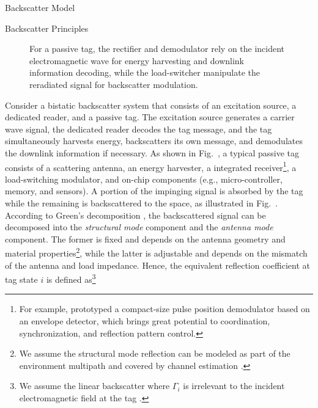 \documentclass[journal]{IEEEtran}
\begin{document}
\begin{section}{Backscatter Model}
\begin{subsection}{Backscatter Principles}
\begin{figure}[!t]
{					\label{fi:block_diagram}
				}
				\caption{For a passive tag, the rectifier and demodulator rely on the incident electromagnetic wave for energy harvesting and downlink information decoding, while the load-switcher manipulate the reradiated signal for backscatter modulation.}
				\label{fi:tag}
			\end{figure}
			Consider a bistatic backscatter system that consists of an excitation source, a dedicated reader, and a passive tag. The excitation source generates a carrier wave signal, the dedicated reader decodes the tag message, and the tag simultaneously harvests energy, backscatters its own message, and demodulates the downlink information if necessary. As shown in Fig.~, a typical passive tag consists of a scattering antenna, an energy harvester, a integrated receiver\footnote{For example, \cite{Kim2021a} prototyped a compact-size pulse position demodulator based on an envelope detector, which brings great potential to coordination, synchronization, and reflection pattern control.}, a load-switching modulator, and on-chip components (e.g., micro-controller, memory, and sensors). A portion of the impinging signal is absorbed by the tag while the remaining is backscattered to the space, as illustrated in Fig.~. According to Green's decomposition \cite{Hansen1989}, the backscattered signal can be decomposed into the \emph{structural mode} component and the \emph{antenna mode} component. The former is fixed and depends on the antenna geometry and material properties\footnote{We assume the structural mode reflection can be modeled as part of the environment multipath and covered by channel estimation \cite{Boyer2014}.}, while the latter is adjustable and depends on the mismatch of the antenna and load impedance. Hence, the equivalent reflection coefficient at tag state $i$ is defined as\footnote{We assume the linear backscatter where $\Gamma_i$ is irrelevant to the incident electromagnetic field at the tag \cite{Dobkin2012}.}

\end{subsection}
\end{section}
\end{document}
